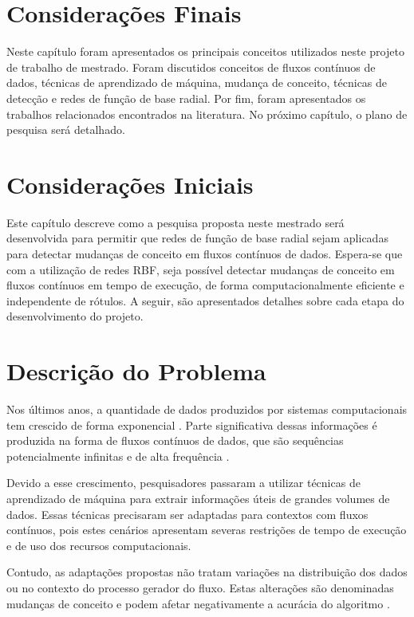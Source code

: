 \documentclass[qual, classic, a4paper]{ufbathesis}
\begin{document}
\section{Considerações Finais}

Neste capítulo foram apresentados os principais conceitos utilizados neste projeto de trabalho de mestrado.
Foram discutidos conceitos de fluxos contínuos de dados, 
técnicas de aprendizado de máquina, 
mudança de conceito,
técnicas de detecção e redes de função de base radial.
Por fim, foram apresentados os trabalhos relacionados encontrados na literatura.
No próximo capítulo, o plano de pesquisa será detalhado.

 \label{plano_pesquisa}
\section{Considerações Iniciais}

Este capítulo descreve como a pesquisa proposta neste mestrado será desenvolvida para permitir que redes de função de base radial sejam aplicadas para detectar mudanças de conceito em fluxos contínuos de dados.
Espera-se que com a utilização de redes RBF, seja possível detectar mudanças de conceito em fluxos contínuos em tempo de execução, de forma computacionalmente eficiente e independente de rótulos.
A seguir, são apresentados detalhes sobre cada etapa do desenvolvimento do projeto.

\section{Descrição do Problema}

Nos últimos anos, a quantidade de dados produzidos por sistemas computacionais tem crescido de forma exponencial \cite{idc_report}.
Parte significativa dessas informações é produzida na forma de fluxos contínuos de dados, que são sequências potencialmente infinitas e de alta frequência \cite{Aggarwal:2006:DSM:1196418}.

Devido a esse crescimento, pesquisadores passaram a utilizar técnicas de aprendizado de máquina para extrair informações úteis de grandes volumes de dados.
Essas técnicas precisaram ser adaptadas para contextos com fluxos contínuos, pois estes cenários apresentam severas restrições de tempo de execução e de uso dos recursos computacionais.

Contudo, as adaptações propostas não tratam variações na distribuição dos dados ou no contexto do processo gerador do fluxo.
Estas alterações são denominadas mudanças de conceito e podem afetar negativamente a acurácia do algoritmo \cite{Gama:2014:SCD:2597757.2523813}.
\end{document}
